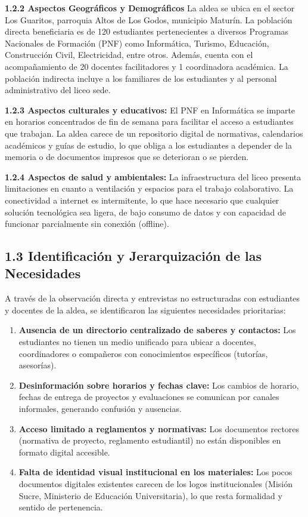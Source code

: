 \documentclass[12pt, letterpaper]{article}
\begin{document}
    \textbf{1.2.2 Aspectos Geográficos y Demográficos} La aldea se ubica en el sector Los Guaritos, parroquia Altos de Los Godos, municipio Maturín. La población directa beneficiaria es de 120 estudiantes pertenecientes a diversos Programas Nacionales de Formación (PNF) como Informática, Turismo, Educación, Construcción Civil, Electricidad, entre otros. Además, cuenta con el acompañamiento de 20 docentes facilitadores y 1 coordinadora académica. La población indirecta incluye a los familiares de los estudiantes y al personal administrativo del liceo sede.
	
	\textbf{1.2.3 Aspectos culturales y educativos:} El PNF en Informática se imparte en horarios concentrados de fin de semana para facilitar el acceso a estudiantes que trabajan. La aldea carece de un repositorio digital de normativas, calendarios académicos y guías de estudio, lo que obliga a los estudiantes a depender de la memoria o de documentos impresos que se deterioran o se pierden.
	
	\textbf{1.2.4 Aspectos de salud y ambientales:} La infraestructura del liceo presenta limitaciones en cuanto a ventilación y espacios para el trabajo colaborativo. La conectividad a internet es intermitente, lo que hace necesario que cualquier solución tecnológica sea ligera, de bajo consumo de datos y con capacidad de funcionar parcialmente sin conexión (offline).
	
	\subsection*{1.3 Identificación y Jerarquización de las Necesidades}
	
	A través de la observación directa y entrevistas no estructuradas con estudiantes y docentes de la aldea, se identificaron las siguientes necesidades prioritarias:
	
	\begin{enumerate}
		\item \textbf{Ausencia de un directorio centralizado de saberes y contactos:} Los estudiantes no tienen un medio unificado para ubicar a docentes, coordinadores o compañeros con conocimientos específicos (tutorías, asesorías).
		\item \textbf{Desinformación sobre horarios y fechas clave:} Los cambios de horario, fechas de entrega de proyectos y evaluaciones se comunican por canales informales, generando confusión y ausencias.
		\item \textbf{Acceso limitado a reglamentos y normativas:} Los documentos rectores (normativa de proyecto, reglamento estudiantil) no están disponibles en formato digital accesible.
		\item \textbf{Falta de identidad visual institucional en los materiales:} Los pocos documentos digitales existentes carecen de los logos institucionales (Misión Sucre, Ministerio de Educación Universitaria), lo que resta formalidad y sentido de pertenencia.
	\end{enumerate}
	
\end{document}

